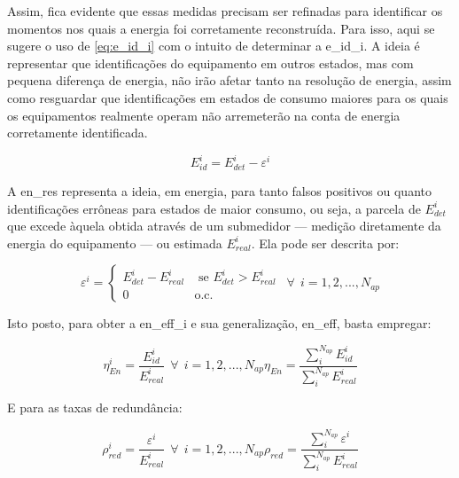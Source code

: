 Assim, fica evidente que essas medidas precisam ser refinadas para
identificar os momentos nos quais a energia foi corretamente
reconstruída. Para isso, aqui se sugere o uso de \ref{eq:e_id_i} com
o intuito de determinar a \gls{e_id_i}. A ideia
é representar que identificações do equipamento em outros estados, mas
com pequena diferença de energia, não irão afetar tanto na resolução
de energia, assim como resguardar que identificações em estados de
consumo maiores para os quais os equipamentos realmente operam não
arremeterão na conta de energia corretamente identificada.

\begin{equation}\label{eq:e_id_i}
E_{id}^i = E_{det}^i-\varepsilon^i
\end{equation}

A \gls{en_res} representa a ideia, em energia, para tanto falsos
positivos ou quanto identificações errôneas para estados de maior
consumo, ou seja, a parcela de $E_{det}^i$ que excede àquela obtida
através de um submedidor --- medição diretamente da energia do
equipamento --- ou estimada $E_{real}^i$. Ela pode ser descrita
por:

\begin{equation}\label{eq:en_res}
\varepsilon^i = \left\{\begin{array}{rl}
 E_{det}^i - E_{real}^i &\mbox{ se $E_{det}^i>E_{real}^i$} \\
 0 &\mbox{o.c.}
\end{array} \right. ~~ \forall ~~ i = 1,2,...,N_{ap}
\end{equation}

Isto posto, para obter a \gls{en_eff_i} e sua generalização,
\gls{en_eff}, basta empregar:

\begin{subequations}
\begin{equation}\label{eq:en_eff_i}
\eta_{En}^i = \frac{E_{id}^i}{E_{real}^i} ~~ \forall ~~ i =
1,2,...,N_{ap}
\end{equation}
\begin{equation}\label{eq:en_eff}
\eta_{En} = \frac{\sum_{i}^{N_{ap}}E_{id}^i}{\sum_{i}^{N_{ap}}E_{real}^i}
\end{equation}
\end{subequations}

E para as taxas de redundância:

\begin{subequations}
\begin{equation}\label{eq:p_red_i}
\rho_{red}^i = \frac{\varepsilon^i}{E_{real}^i} ~~ \forall ~~ i =
1,2,...,N_{ap}
\end{equation}
\begin{equation}\label{eq:p_red}
\rho_{red} = \frac{\sum_{i}^{N_{ap}}\varepsilon^i}{\sum_{i}^{N_{ap}}E_{real}^i}
\end{equation}
\end{subequations}

